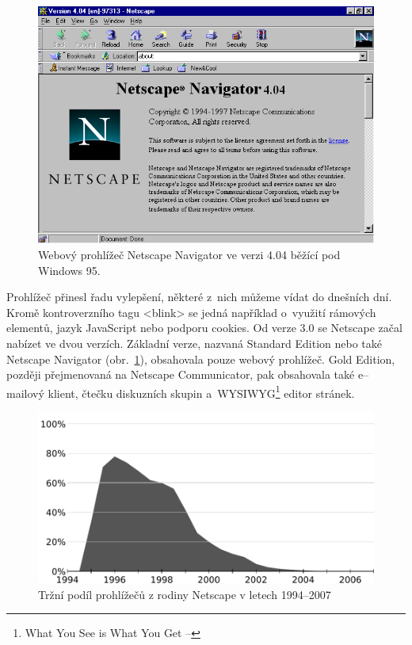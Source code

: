 \documentclass[a4paper, 11pt]{scrartcl}
\begin{document}
\begin{figure}[ht]
\centering
\includegraphics[scale=0.7]{ntsc.png}
\caption{Webový prohlížeč Netscape Navigator ve verzi 4.04 běžící pod Windows 95.}
\label{fig:two}
\end{figure}

Prohlížeč přinesl řadu vylepšení, některé z~nich můžeme vídat do dnešních dní. Kromě kontroverzního tagu \textless blink\textgreater{} se jedná například o~využití rámových elementů, jazyk JavaScript nebo podporu cookies. Od verze 3.0 se Netscape začal nabízet ve dvou verzích. Základní verze, nazvaná Standard Edition nebo také Netscape Navigator (obr.~\ref{fig:two}), obsahovala pouze webový prohlížeč. Gold Edition, později přejmenovaná na Netscape Communicator, pak obsahovala také e–mailový klient, čtečku diskuzních skupin a~WYSIWYG\footnote{What You See is What You Get – } editor stránek.

\begin{figure}[ht]
\centering
\includegraphics[scale=.8]{marketshare.pdf}
\caption{Tržní podíl prohlížečů z rodiny Netscape v letech 1994–2007}
\label{fig:three}
\end{figure}
\end{document}
